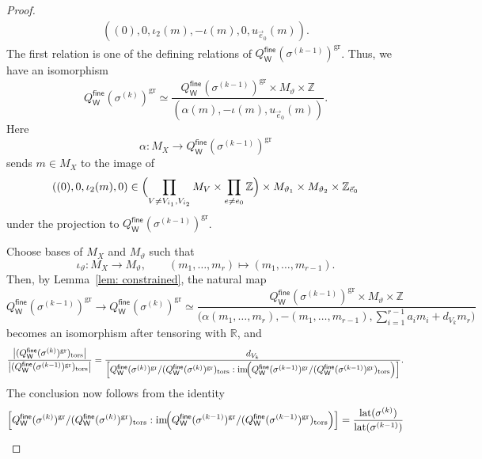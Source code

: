 \documentclass[10pt,a4paper]{amsart}
\newcommand{\W}{\mathsf{W}}
\newcommand{\fine}{\mathsf{fine}}
\newcommand{\gr}{\mathrm{gr}}
\newcommand{\tors}{\mathrm{tors}}
\begin{document}
\begin{proof}
\begin{align*}
            ((0), 0, \iota_2(m) , -\iota(m), 0, u_{\vec{e}_0}(m)). 
    \end{align*}
    The first relation is one of the defining relations of $Q_{\W}^{\fine}(\sigma^{(k-1)})^{\gr}$. Thus, we have an isomorphism
\[
Q_{\W}^{\fine}(\sigma^{(k)})^{\gr}
\simeq
\frac{
Q_{\W}^{\fine}(\sigma^{(k-1)})^{\gr}
\times M_{\vartheta}
\times \mathbb{Z}
}{
(\alpha(m),-\iota(m),u_{\vec e_0}(m))
}.
\]
Here
\[
\alpha:M_X\longrightarrow Q_\W^\fine(\sigma^{(k-1)})^{\gr}
\]
sends $m\in M_X$ to the image of
\[
((0),0,\iota_2(m),0)
\in
\Bigl(
\prod_{V\neq V_{i_1},V_{i_2}} M_V
\times
\prod_{e\neq e_0}\mathbb Z
\Bigr)
\times M_{\vartheta_1}
\times M_{\vartheta_2}
\times \mathbb Z_{\vec e_0}
\]
under the projection to $Q_\W^\fine(\sigma^{(k-1)})^{\gr}$.

Choose bases of $M_X$ and $M_{\vartheta}$ such that
\[
\iota_\vartheta:M_X\to M_\vartheta,
\qquad
(m_1,\ldots,m_r)\longmapsto (m_1,\ldots,m_{r-1}).
\]
Then, by Lemma~\ref{lem: constrained}, the natural map
\[
Q_\W^\fine(\sigma^{(k-1)})^\gr
\longrightarrow
Q_{\W}^{\fine}(\sigma^{(k)})^{\gr}
\simeq
\frac{
Q_{\W}^{\fine}(\sigma^{(k-1)})^{\gr}
\times M_{\vartheta}
\times \mathbb{Z}
}{
\bigl(
\alpha(m_1,\ldots,m_r),
-(m_1,\ldots,m_{r-1}),
\sum_{i=1}^{r-1} a_i m_i + d_{V_k}m_r
\bigr)
}
\]
becomes an isomorphism after tensoring with $\mathbb R$, and
\[
\frac{\bigl|(Q_\W^\fine(\sigma^{(k)})^{\gr})_{\tors}\bigr|}
     {\bigl|(Q_\W^\fine(\sigma^{(k-1)})^{\gr})_{\tors}\bigr|}
=
\frac{d_{V_k}}
{\left[
Q_\W^\fine(\sigma^{(k)})^{\gr}/(Q_\W^\fine(\sigma^{(k)})^{\gr})_{\tors}
:
\operatorname{im}\!\Bigl(
Q_\W^\fine(\sigma^{(k-1)})^{\gr}/(Q_\W^\fine(\sigma^{(k-1)})^{\gr})_{\tors}
\Bigr)
\right]}.
\]
The conclusion now follows from the identity
$$
\left[
Q_\W^\fine(\sigma^{(k)})^{\gr}/(Q_\W^\fine(\sigma^{(k)})^{\gr})_{\tors}
:
\operatorname{im}\!\Bigl(
Q_\W^\fine(\sigma^{(k-1)})^{\gr}/(Q_\W^\fine(\sigma^{(k-1)})^{\gr})_{\tors}
\Bigr)
\right]= \frac{ \mathrm{lat}(\sigma^{(k)})}{\mathrm{lat}(\sigma^{(k-1)})}
$$
    
\end{proof}
\end{document}
